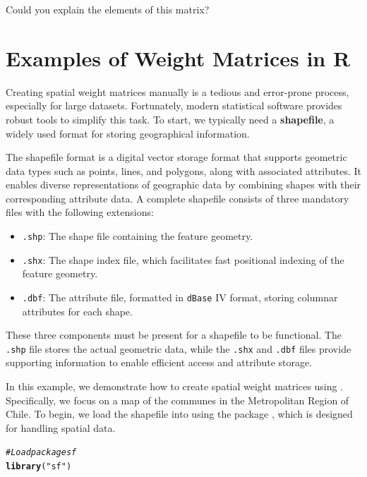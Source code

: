 \documentclass[english,12pt]{book}\usepackage[]{graphicx}\usepackage[]{xcolor}
\makeatletter
\newcommand{\hlstr}[1]{\textcolor[rgb]{0.192,0.494,0.8}{#1}}%
\newcommand{\hlcom}[1]{\textcolor[rgb]{0.678,0.584,0.686}{\textit{#1}}}%
\newcommand{\hlstd}[1]{\textcolor[rgb]{0.345,0.345,0.345}{#1}}%
\newcommand{\hlkwd}[1]{\textcolor[rgb]{0.737,0.353,0.396}{\textbf{#1}}}%
\newenvironment{kframe}{%
 \def\at@end@of@kframe{}%
 \ifinner\ifhmode%
  \def\at@end@of@kframe{\end{minipage}}%
  \begin{minipage}{\columnwidth}%
 \fi\fi%
 \def\FrameCommand##1{\hskip\@totalleftmargin \hskip-\fboxsep
 \colorbox{shadecolor}{##1}\hskip-\fboxsep
     \hskip-\linewidth \hskip-\@totalleftmargin \hskip\columnwidth}%
 \MakeFramed {\advance\hsize-\width
   \@totalleftmargin\z@ \linewidth\hsize
   \@setminipage}}%
 {\par\unskip\endMakeFramed%
 \at@end@of@kframe}
\newenvironment{knitrout}{}{} %
\makeatother
\begin{document}
Could you explain the elements of this matrix?

\section{Examples of Weight Matrices in R}

Creating spatial weight matrices manually is a tedious and error-prone process, especially for large datasets. Fortunately, modern statistical software provides robust tools to simplify this task. To start, we typically need a \textbf{shapefile}, a widely used format for storing geographical information.

The shapefile format is a digital vector storage format that supports geometric data types such as points, lines, and polygons, along with associated attributes. It enables diverse representations of geographic data by combining shapes with their corresponding attribute data. A complete shapefile consists of three mandatory files with the following extensions:
\begin{itemize}
  \item \texttt{.shp}: The shape file containing the feature geometry.
  \item \texttt{.shx}: The shape index file, which facilitates fast positional indexing of the feature geometry.
  \item \texttt{.dbf}: The attribute file, formatted in \texttt{dBase} IV format, storing columnar attributes for each shape.
\end{itemize}

These three components must be present for a shapefile to be functional. The \texttt{.shp} file stores the actual geometric data, while the \texttt{.shx} and \texttt{.dbf} files provide supporting information to enable efficient access and attribute storage.

In this example, we demonstrate how to create spatial weight matrices using . Specifically, we focus on a map of the communes in the Metropolitan Region of Chile. To begin, we load the shapefile into  using the  package \citep{pabesmasf}, which is designed for handling spatial data.

\begin{knitrout}
\color{fgcolor}\begin{kframe}
\begin{alltt}
\hlcom{#Load package sf}
\hlkwd{library}\hlstd{(}\hlstr{"sf"}\hlstd{)}
\end{alltt}
\end{kframe}
\end{knitrout}
\end{document}
